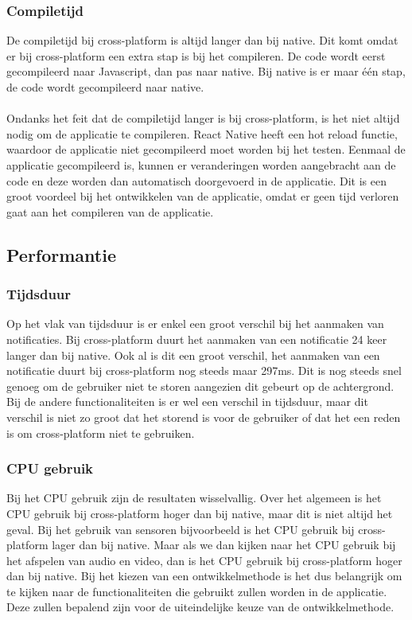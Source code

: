 \subsubsection{Compiletijd}
De compiletijd bij cross-platform is altijd langer dan bij native. Dit komt omdat er bij cross-platform
een extra stap is bij het compileren. De code wordt eerst gecompileerd naar Javascript, dan pas naar native.
Bij native is er maar één stap, de code wordt gecompileerd naar native.
\\\\
Ondanks het feit dat de compiletijd langer is bij cross-platform, is het niet altijd nodig om de applicatie te compileren.
React Native heeft een hot reload functie, waardoor de applicatie niet gecompileerd moet worden bij het testen.
Eenmaal de applicatie gecompileerd is, kunnen er veranderingen worden aangebracht aan de code en deze worden dan
automatisch doorgevoerd in de applicatie. Dit is een groot voordeel bij het ontwikkelen van de applicatie,
omdat er geen tijd verloren gaat aan het compileren van de applicatie.

\subsection{Performantie}
\subsubsection{Tijdsduur}
Op het vlak van tijdsduur is er enkel een groot verschil bij het aanmaken van notificaties.
Bij cross-platform duurt het aanmaken van een notificatie 24 keer langer dan bij native.
Ook al is dit een groot verschil, het aanmaken van een notificatie duurt bij cross-platform 
nog steeds maar 297ms. Dit is nog steeds snel genoeg om de gebruiker niet te storen 
aangezien dit gebeurt op de achtergrond. Bij de andere functionaliteiten is er wel een verschil
in tijdsduur, maar dit verschil is niet zo groot dat het storend is voor de gebruiker of dat het een 
reden is om cross-platform niet te gebruiken.

\subsubsection{CPU gebruik}
Bij het CPU gebruik zijn de resultaten wisselvallig. Over het algemeen is het CPU gebruik bij cross-platform
hoger dan bij native, maar dit is niet altijd het geval. Bij het gebruik van sensoren bijvoorbeeld is het CPU gebruik
bij cross-platform lager dan bij native. Maar als we dan kijken naar het CPU gebruik bij het afspelen van audio en 
video, dan is het CPU gebruik bij cross-platform hoger dan bij native. Bij het kiezen van een ontwikkelmethode is het 
dus belangrijk om te kijken naar de functionaliteiten die gebruikt zullen worden in de applicatie. 
Deze zullen bepalend zijn voor de uiteindelijke keuze van de ontwikkelmethode.

